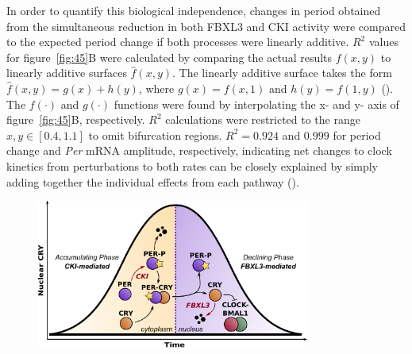 In order to quantify this biological independence, changes in period obtained from the simultaneous reduction in both FBXL3 and CKI activity were compared to the expected period change if both processes were linearly additive.
$R^2$ values for figure~\ref{fig:45}B were calculated by comparing the actual results $f(x,y)$ to linearly additive surfaces $\hat{f}(x,y)$.
The linearly additive surface takes the form $\hat{f}(x,y) = g(x) + h(y)$, where $g(x) = f(x,1)$ and $h(y) = f(1,y)$ (). 
The $f(\cdot)$ and $g(\cdot)$ functions were found by interpolating the x- and y- axis of figure~\ref{fig:45}B, respectively.
$R^2$ calculations were restricted to the range $x,y \in [0.4, 1.1]$ to omit bifurcation regions.
$R^2 = 0.924$ and $0.999$ for period change and {\itshape Per} mRNA amplitude, respectively, indicating net changes to clock kinetics from perturbations to both rates can be closely explained by simply adding together the individual effects from each pathway ().

\begin{figure}[h]
  \centering
  \includegraphics[width=0.8\textwidth]{chap4/figures/fig6.pdf}
  \label{fig:46}
\end{figure}

